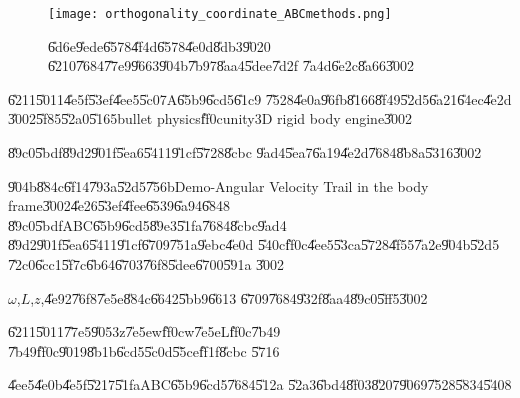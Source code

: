 \begin{figure}[th]
\caption{\U{6d6e}\U{9ede}\U{6578}\U{4f4d}\U{6578}\U{4e0d}\U{8db3}\U{9020}%
\U{6210}\U{7684}\U{77e9}\U{9663}\U{904b}\U{7b97}\U{8aa4}\U{5dee}\U{7d2f}%
\U{7a4d}\U{6e2c}\U{8a66}\U{3002}}
\begin{center}
\texttt{[image: orthogonality\_coordinate\_ABCmethods.png]}
\end{center}
\end{figure}

\clearpage%

\begin{case}
\U{6211}\U{5011}\U{4e5f}\U{53ef}\U{4ee5}\U{5c07}A\U{65b9}\U{6cd5}\U{61c9}%
\U{7528}\U{4e0a}\U{96fb}\U{8166}\U{8f49}\U{52d5}\U{6a21}\U{64ec}\U{4e2d}%
\U{3002}\U{5f85}\U{52a0}\U{5165}bullet physics\U{ff0c}unity3D rigid body
engine\U{3002}
\end{case}

\begin{case}
\U{89c0}\U{5bdf}\U{89d2}\U{901f}\U{5ea6}\U{5411}\U{91cf}\U{5728}\U{8cbc}%
\U{9ad4}\U{5ea7}\U{6a19}\U{4e2d}\U{7684}\U{8b8a}\U{5316}\U{3002}
\end{case}

\U{904b}\U{884c}\U{6f14}\U{793a}\U{52d5}\U{756b}Demo-Angular Velocity Trail
in the body frame\U{3002}\U{4e26}\U{53ef}\U{4fee}\U{6539}\U{6a94}\U{6848}%
\U{89c0}\U{5bdf}ABC\U{65b9}\U{6cd5}\U{89e3}\U{51fa}\U{7684}\U{8cbc}\U{9ad4}%
\U{89d2}\U{901f}\U{5ea6}\U{5411}\U{91cf}\U{6709}\U{751a}\U{9ebc}\U{4e0d}%
\U{540c}\U{ff0c}\U{4ee5}\U{53ca}\U{5728}\U{4f55}\U{7a2e}\U{904b}\U{52d5}%
\U{72c0}\U{6cc1}\U{5f7c}\U{6b64}\U{6703}\U{76f8}\U{5dee}\U{6700}\U{591a}%
\U{3002}

\bigskip

\begin{case}
$\omega $,$L$,$z$,\U{4e92}\U{76f8}\U{7e5e}\U{884c}\U{6642}\U{5bb9}\U{6613}%
\U{6709}\U{7684}\U{932f}\U{8aa4}\U{89c0}\U{5ff5}\U{3002}
\end{case}

\U{6211}\U{5011}\U{77e5}\U{9053}z\U{7e5e}w\U{ff0c}w\U{7e5e}L\U{ff0c}\U{7b49}%
\U{7b49}\U{ff0c}\U{9019}\U{8b1b}\U{6cd5}\U{5c0d}\U{55ce}\U{ff1f}\U{8cbc}%
\U{5716}

\bigskip

\begin{case}
\U{4ee5}\U{4e0b}\U{4e5f}\U{5217}\U{51fa}ABC\U{65b9}\U{6cd5}\U{7684}\U{512a}%
\U{52a3}\U{6bd4}\U{8f03}\U{8207}\U{9069}\U{7528}\U{5834}\U{5408}
\end{case}

